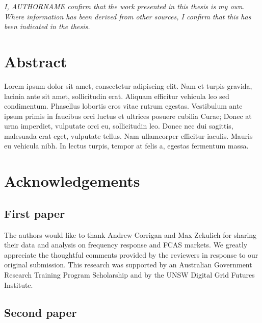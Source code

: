 \documentclass[12pt,a4paper,]{report}
\begin{document}
\vspace*{\fill}

\noindent \textit{
I, AUTHORNAME confirm that the work presented in this thesis is my own. Where information has been derived from other sources, I confirm that this has been indicated in the thesis.
} \vspace*{\fill}  \newpage

\hypertarget{abstract}{%
\chapter*{Abstract}\label{abstract}}

Lorem ipsum dolor sit amet, consectetur adipiscing elit. Nam et turpis
gravida, lacinia ante sit amet, sollicitudin erat. Aliquam efficitur
vehicula leo sed condimentum. Phasellus lobortis eros vitae rutrum
egestas. Vestibulum ante ipsum primis in faucibus orci luctus et
ultrices posuere cubilia Curae; Donec at urna imperdiet, vulputate orci
eu, sollicitudin leo. Donec nec dui sagittis, malesuada erat eget,
vulputate tellus. Nam ullamcorper efficitur iaculis. Mauris eu vehicula
nibh. In lectus turpis, tempor at felis a, egestas fermentum massa.

\setcounter{page}{1}

\hypertarget{acknowledgements}{%
\chapter*{Acknowledgements}\label{acknowledgements}}

\hypertarget{first-paper}{%
\section{First paper}\label{first-paper}}

The authors would like to thank Andrew Corrigan and Max Zekulich for
sharing their data and analysis on frequency response and FCAS markets.
We greatly appreciate the thoughtful comments provided by the reviewers
in response to our original submission. This research was supported by
an Australian Government Research Training Program Scholarship and by
the UNSW Digital Grid Futures Institute.

\hypertarget{second-paper}{%
\section{Second paper}\label{second-paper}}
\end{document}

